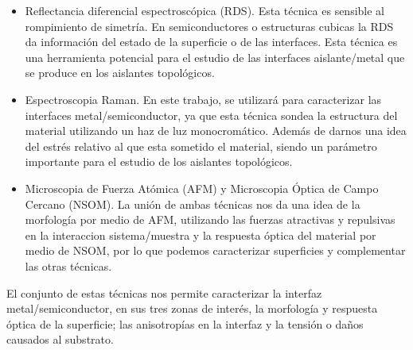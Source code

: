 \begin{itemize}
    \item Reflectancia diferencial espectroscópica (RDS). Esta técnica es sensible al rompimiento 
    de simetría. En semiconductores o estructuras cubicas la RDS da información del estado de la superficie o de las interfaces. Esta técnica es una herramienta potencial para el estudio de las interfaces aislante/metal que se produce en los aislantes topológicos.

    \item Espectroscopia Raman. En este trabajo, se utilizará para caracterizar las interfaces 
    metal/semiconductor, ya que esta técnica sondea la estructura del material utilizando un haz de luz 
    monocromático. Además de darnos una idea del estrés relativo al que esta sometido el material, siendo 
    un parámetro importante para el estudio de los aislantes topológicos.

    \item Microscopia de Fuerza Atómica (AFM) y Microscopia Óptica de Campo Cercano 
    (NSOM). La unión de ambas técnicas nos da una idea de la morfología por medio de AFM, utilizando las fuerzas atractivas y repulsivas en la interaccion sistema/muestra y la respuesta óptica del material por medio de NSOM, por lo que podemos caracterizar superficies y complementar las otras técnicas.
\end{itemize}

El conjunto de estas técnicas nos permite caracterizar la interfaz metal/semiconductor, en sus tres zonas de interés, la morfología y respuesta óptica de la superficie; las anisotropías en la interfaz y la tensión o daños causados al substrato.